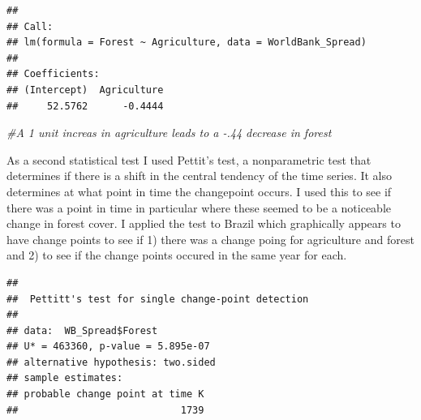 \documentclass[12pt,]{article}
\newenvironment{Shaded}{\begin{snugshade}}{\end{snugshade}}
\newcommand{\KeywordTok}[1]{\textcolor[rgb]{0.13,0.29,0.53}{\textbf{#1}}}
\newcommand{\CommentTok}[1]{\textcolor[rgb]{0.56,0.35,0.01}{\textit{#1}}}
\newcommand{\OperatorTok}[1]{\textcolor[rgb]{0.81,0.36,0.00}{\textbf{#1}}}
\newcommand{\NormalTok}[1]{#1}
\begin{document}
\begin{verbatim}
## 
## Call:
## lm(formula = Forest ~ Agriculture, data = WorldBank_Spread)
## 
## Coefficients:
## (Intercept)  Agriculture  
##     52.5762      -0.4444
\end{verbatim}

\begin{Shaded}
\begin{Highlighting}[]
\CommentTok{#A 1 unit increas in agriculture leads to a -.44 decrease in forest }
\end{Highlighting}
\end{Shaded}

As a second statistical test I used Pettit's test, a nonparametric test
that determines if there is a shift in the central tendency of the time
series. It also determines at what point in time the changepoint occurs.
I used this to see if there was a point in time in particular where
these seemed to be a noticeable change in forest cover. I applied the
test to Brazil which graphically appears to have change points to see if
1) there was a change poing for agriculture and forest and 2) to see if
the change points occured in the same year for each.

\begin{Shaded}
\end{Shaded}

\begin{verbatim}
## 
##  Pettitt's test for single change-point detection
## 
## data:  WB_Spread$Forest
## U* = 463360, p-value = 5.895e-07
## alternative hypothesis: two.sided
## sample estimates:
## probable change point at time K 
##                            1739
\end{verbatim}

\begin{Shaded}
\end{Shaded}
\end{document}
